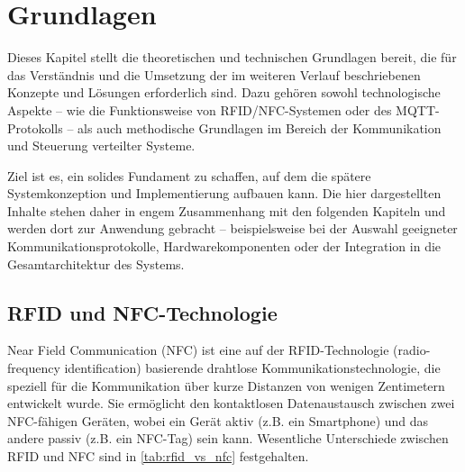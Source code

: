 \chapter{Grundlagen}
\label{cha:Grundlagen}


Dieses Kapitel stellt die theoretischen und technischen Grundlagen bereit, die für das Verständnis und die Umsetzung der im weiteren Verlauf beschriebenen Konzepte und Lösungen erforderlich sind. Dazu gehören sowohl technologische Aspekte – wie die Funktionsweise von RFID/NFC-Systemen oder des MQTT-Protokolls – als auch methodische Grundlagen im Bereich der Kommunikation und Steuerung verteilter Systeme.

Ziel ist es, ein solides Fundament zu schaffen, auf dem die spätere Systemkonzeption und Implementierung aufbauen kann. Die hier dargestellten Inhalte stehen daher in engem Zusammenhang mit den folgenden Kapiteln und werden dort zur Anwendung gebracht – beispielsweise bei der Auswahl geeigneter Kommunikationsprotokolle, Hardwarekomponenten oder der Integration in die Gesamtarchitektur des Systems.

\section{RFID und NFC-Technologie}
\label{sec:nfc}

Near Field Communication (NFC) ist eine auf der RFID-Technologie (radio-frequency identification) basierende drahtlose Kommunikationstechnologie, die speziell für die Kommunikation über kurze Distanzen von wenigen Zentimetern entwickelt wurde. Sie ermöglicht den kontaktlosen Datenaustausch zwischen zwei NFC-fähigen Geräten, wobei ein Gerät aktiv (z.B. ein Smartphone) und das andere passiv (z.B. ein NFC-Tag) sein kann. Wesentliche Unterschiede zwischen RFID und NFC sind in \autoref{tab:rfid_vs_nfc} festgehalten. 

